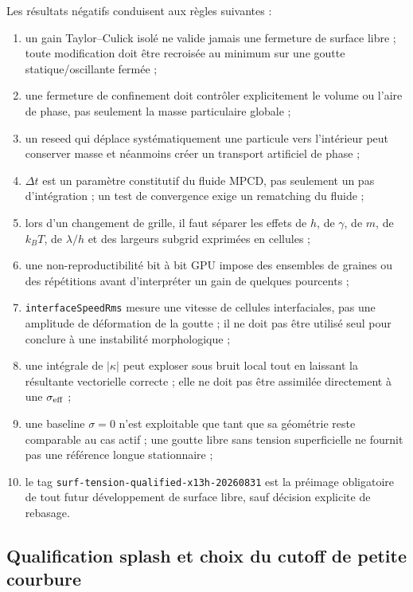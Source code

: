 \documentclass[11pt,a4paper]{article}
\begin{document}
Les résultats négatifs conduisent aux règles suivantes :
\begin{enumerate}[leftmargin=2em]
  \item un gain Taylor--Culick isolé ne valide jamais une fermeture de surface libre ; toute modification doit être recroisée au minimum sur une goutte statique/oscillante fermée ;
  \item une fermeture de confinement doit contrôler explicitement le volume ou l'aire de phase, pas seulement la masse particulaire globale ;
  \item un reseed qui déplace systématiquement une particule vers l'intérieur peut conserver masse et néanmoins créer un transport artificiel de phase ;
  \item $\Delta t$ est un paramètre constitutif du fluide MPCD, pas seulement un pas d'intégration ; un test de convergence exige un rematching du fluide ;
  \item lors d'un changement de grille, il faut séparer les effets de $h$, de $\gamma$, de $m$, de $k_BT$, de $\lambda/h$ et des largeurs subgrid exprimées en cellules ;
  \item une non-reproductibilité bit à bit GPU impose des ensembles de graines ou des répétitions avant d'interpréter un gain de quelques pourcents ;
  \item \texttt{interfaceSpeedRms} mesure une vitesse de cellules interfaciales, pas une amplitude de déformation de la goutte ; il ne doit pas être utilisé seul pour conclure à une instabilité morphologique ;
  \item une intégrale de $|\kappa|$ peut exploser sous bruit local tout en laissant la résultante vectorielle correcte ; elle ne doit pas être assimilée directement à une $\sigma_{\rm eff}$ ;
  \item une baseline $\sigma=0$ n'est exploitable que tant que sa géométrie reste comparable au cas actif ; une goutte libre sans tension superficielle ne fournit pas une référence longue stationnaire ;
  \item le tag \texttt{surf-tension-qualified-x13h-20260831} est la préimage obligatoire de tout futur développement de surface libre, sauf décision explicite de rebasage.
\end{enumerate}

\subsection{Qualification splash et choix du cutoff de petite courbure}
\end{document}
